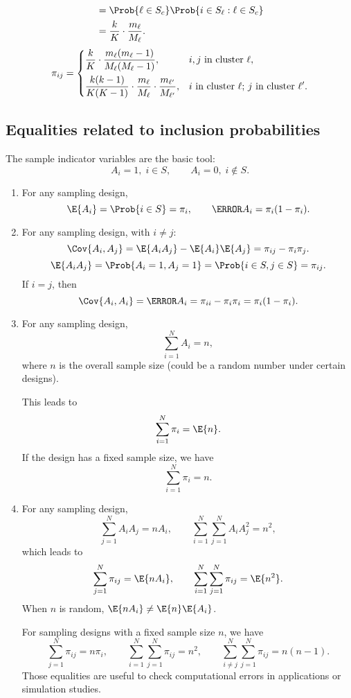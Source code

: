 \begin{enumerate}[(1)]
\begin{align*}
                   & =\Prob{\ell\in S_c}\Prob{i\in S_{\ell}\given \ell \in S_c} \\
                   & =\frac{k}{K}\cdot \frac{m_{\ell}}{M_{\ell}}.
            \end{align*}
            \[ \pi_{ij}=\begin{dcases}
                        \frac{k}{K}\cdot \frac{m_{\ell}(m_{\ell}-1)}{M_{\ell}(M_{\ell}-1)},                                & \text{$i,j$ in cluster $ \ell $},                               \\
                        \frac{k(k-1)}{K(K-1)}\cdot \frac{m_{\ell}}{M_{\ell}}\cdot \frac{m_{\ell^\prime}}{M_{\ell^\prime}}, & \text{$i$ in cluster $ \ell $; $j$ in cluster $ \ell^\prime $}.
                  \end{dcases} \]
\end{enumerate}
\subsection{Equalities related to inclusion probabilities}
The sample indicator variables are the basic tool:
\[ A_i=1,\; i\in S,\qquad A_i=0,\; i\notin S. \]
\begin{enumerate}[(1)]
      \item For any sampling design,
            \[ \E{A_i}=\Prob{i\in S}=\pi_i,\qquad \V{A_i}=\pi_i(1-\pi_i). \]
      \item For any sampling design, with $ i\ne j $:
            \[ \Cov{A_i,A_j}=\E{A_i A_j}-\E{A_i}\E{A_j}=\pi_{ij}-\pi_i\pi_j. \]
            \[ \E{A_i A_j}=\Prob{A_i=1,A_j=1}=\Prob{i\in S,j\in S}=\pi_{ij}. \]
            If $ i=j $, then
            \[ \Cov{A_i,A_i}=\V{A_i}=\pi_{ii}-\pi_i\pi_i=\pi_i(1-\pi_i). \]
      \item For any sampling design,
            \[ \sum_{i=1}^{N}A_i=n, \]
            where $ n $ is the overall sample size (could be a random number under certain designs).

            This leads to
            \[ \sum_{i=1}^{N}\pi_i=\E{n}. \]
            If the design has a fixed sample size, we have
            \[ \sum_{i=1}^{N}\pi_i=n. \]
      \item For any sampling design,
            \[ \sum_{j=1}^{N}A_i A_j=nA_i,\qquad \sum_{i=1}^{N}\sum_{j=1}^{N}A_i A_j^2=n^2, \]
            which leads to
            \[ \sum_{j=1}^{N}\pi_{ij}=\E{n A_i},\qquad \sum_{i=1}^{N}\sum_{j=1}^{N}\pi_{ij}=\E{n^2}. \]
            When $ n $ is random, $ \E{n A_i}\ne \E{n}\E{A_i} $.

            For sampling designs with a fixed sample size $ n $, we have
            \[ \sum_{j=1}^{N}\pi_{ij}=n\pi_i,\qquad \sum_{i=1}^{N}\sum_{j=1}^{N}\pi_{ij}=n^2,\qquad \sum_{i\ne j}^{N}\sum_{j=1}^{N}\pi_{ij}=n(n-1). \]
            Those equalities are useful to check computational errors in
            applications or simulation studies.
\end{enumerate}
